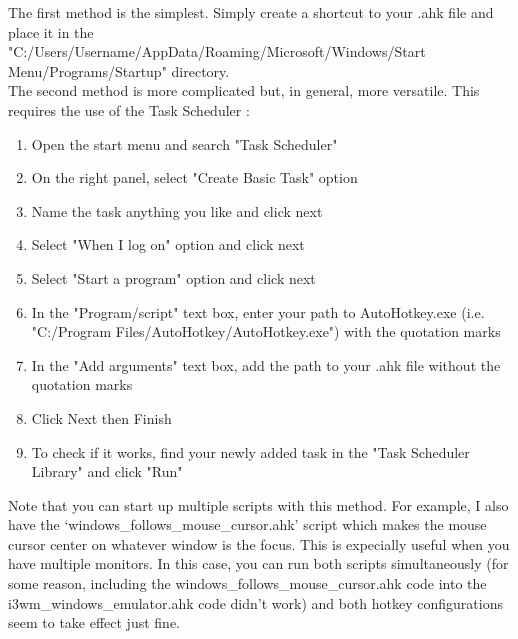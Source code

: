 The first method is the simplest. Simply create a shortcut to your .ahk file
and place it in the\\
"C:/Users/Username/AppData/Roaming/Microsoft/Windows/Start
Menu/Programs/Startup" directory.\\

The second method is more complicated but, in general, more versatile. This
requires the use of the Task Scheduler \cite{bashkarla2016how}:
\begin{enumerate}
    \item Open the start menu and search "Task Scheduler"
    \item On the right panel, select "Create Basic Task" option
    \item Name the task anything you like and click next
    \item Select "When I log on" option and click next
    \item Select "Start a program" option and click next
    \item In the "Program/script" text box, enter your path to AutoHotkey.exe
        (i.e. "C:/Program Files/AutoHotkey/AutoHotkey.exe") with the quotation marks
    \item In the "Add arguments" text box, add the path to your .ahk file
        without the quotation marks
    \item Click Next then Finish
    \item To check if it works, find your newly added task in the "Task Scheduler Library" and
       click "Run"
\end{enumerate}
Note that you can start up multiple scripts with this method. For example, I
also have the `windows\_follows\_mouse\_cursor.ahk' script which makes the mouse
cursor center on whatever window is the focus. This is expecially useful when
you have multiple monitors. In this case, you can run both scripts
simultaneously (for some reason, including the
windows\_follows\_mouse\_cursor.ahk code into the i3wm\_windows\_emulator.ahk
code didn't work) and both hotkey configurations seem to take effect just fine.
